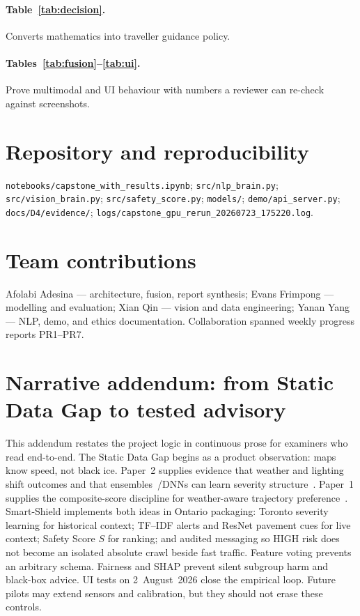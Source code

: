 \documentclass[11pt,a4paper]{article}
\begin{document}
\paragraph{Table~\ref{tab:decision}.} Converts mathematics into traveller guidance policy.
\paragraph{Tables~\ref{tab:fusion}--\ref{tab:ui}.} Prove multimodal and UI behaviour with numbers a reviewer can re-check against screenshots.

\section*{Repository and reproducibility}
\texttt{notebooks/capstone\_with\_results.ipynb}; \texttt{src/nlp\_brain.py}; \texttt{src/vision\_brain.py}; \texttt{src/safety\_score.py}; \texttt{models/}; \texttt{demo/api\_server.py}; \texttt{docs/D4/evidence/}; \texttt{logs/capstone\_gpu\_rerun\_20260723\_175220.log}.

\section*{Team contributions}
Afolabi Adesina --- architecture, fusion, report synthesis; Evans Frimpong --- modelling and evaluation; Xian Qin --- vision and data engineering; Yanan Yang --- NLP, demo, and ethics documentation. Collaboration spanned weekly progress reports PR1--PR7.

\section*{Narrative addendum: from Static Data Gap to tested advisory}
This addendum restates the project logic in continuous prose for examiners who read end-to-end. The Static Data Gap begins as a product observation: maps know speed, not black ice. Paper~2 supplies evidence that weather and lighting shift outcomes and that ensembles~/DNNs can learn severity structure~\citep{jiang2024traffic}. Paper~1 supplies the composite-score discipline for weather-aware trajectory preference~\citep{pennino2024weather}. Smart-Shield implements both ideas in Ontario packaging: Toronto severity learning for historical context; TF--IDF alerts and ResNet pavement cues for live context; Safety Score $S$ for ranking; and audited messaging so HIGH risk does not become an isolated absolute crawl beside fast traffic. Feature voting prevents an arbitrary schema. Fairness and SHAP prevent silent subgroup harm and black-box advice. UI tests on 2~August~2026 close the empirical loop. Future pilots may extend sensors and calibration, but they should not erase these controls.
\end{document}
